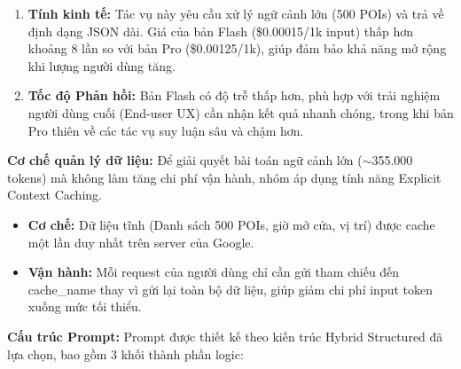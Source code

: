 \begin{enumerate}[label=\arabic*., leftmargin=*]
    \item \textbf{Tính kinh tế:} Tác vụ này yêu cầu xử lý ngữ cảnh lớn (500 POIs) và trả về định dạng JSON dài. Giá của bản Flash (\$0.00015/1k input) thấp hơn khoảng 8 lần so với bản Pro (\$0.00125/1k), giúp đảm bảo khả năng mở rộng khi lượng người dùng tăng.
    
    \item \textbf{Tốc độ Phản hồi:} Bản Flash có độ trễ thấp hơn, phù hợp với trải nghiệm người dùng cuối (End-user UX) cần nhận kết quả nhanh chóng, trong khi bản Pro thiên về các tác vụ suy luận sâu và chậm hơn.
\end{enumerate}

\textbf{Cơ chế quản lý dữ liệu:} Để giải quyết bài toán ngữ cảnh lớn ($\sim$355.000 tokens) mà không làm tăng chi phí vận hành, nhóm áp dụng tính năng Explicit Context Caching.

\begin{itemize}
    \item \textbf{Cơ chế:} Dữ liệu tĩnh (Danh sách 500 POIs, giờ mở cửa, vị trí) được cache một lần duy nhất trên server của Google.
    \item \textbf{Vận hành:} Mỗi request của người dùng chỉ cần gửi tham chiếu đến cache\_name thay vì gửi lại toàn bộ dữ liệu, giúp giảm chi phí input token xuống mức tối thiểu.
\end{itemize}

\textbf{Cấu trúc Prompt:} Prompt được thiết kế theo kiến trúc Hybrid Structured đã lựa chọn, bao gồm 3 khối thành phần logic:

